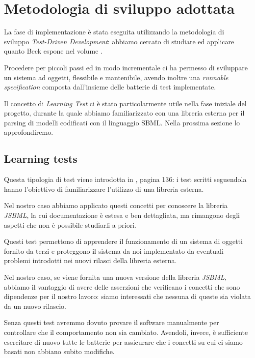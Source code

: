 \section{Metodologia di sviluppo adottata}

La fase di implementazione \`e stata eseguita utilizzando la
metodologia di sviluppo \emph{Test-Driven Development}: abbiamo
cercato di studiare ed applicare quanto Beck espone nel volume
\cite{beck2003}.

Procedere per piccoli passi ed in modo incrementale ci ha permesso di
sviluppare un sistema ad oggetti, flessibile e mantenibile, avendo
inoltre una \emph{runnable specification} composta dall'insieme delle
batterie di test implementate.

Il concetto di \emph{Learning Test} ci \`e stato particolarmente utile
nella fase iniziale del progetto, durante la quale abbiamo
familiarizzato con una libreria esterna per il parsing di modelli
codificati con il linguaggio SBML. Nella prossima sezione lo
approfondiremo.

\subsection{Learning tests}
Questa tipologia di test viene introdotta in \cite{beck2003}, pagina
136: i test scritti seguendola hanno l'obiettivo di familiarizzare
l'utilizzo di una libreria esterna.

Nel nostro caso abbiamo applicato questi concetti per conoscere la
libreria \emph{JSBML}, la cui documentazione \`e estesa e ben
dettagliata, ma rimangono degli aspetti che non \`e possibile
studiarli a priori.

Questi test permettono di apprendere il funzionamento di un sistema di
oggetti fornito da terzi e proteggono il sistema da noi implementato
da eventuali problemi introdotti nei nuovi rilasci della libreria
esterna.

Nel nostro caso, se viene fornita una nuova versione della libreria
\emph{JSBML}, abbiamo il vantaggio di avere delle asserzioni che
verificano i concetti che sono dipendenze per il nostro lavoro: siamo
interessati che nessuna di queste sia violata da un nuovo rilascio.

Senza questi test avremmo dovuto provare il software manualmente per
controllare che il comportamento non sia cambiato. Avendoli, invece,
\`e sufficiente esercitare di nuovo tutte le batterie per assicurare
che i concetti su cui ci siamo basati non abbiano subito modifiche.

